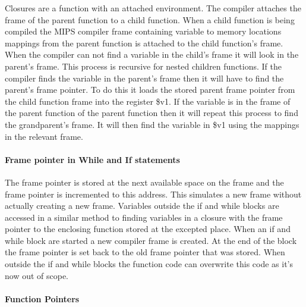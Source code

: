 \documentclass{article}
\begin{document}
	Closures are a function with an attached environment. The compiler attaches the frame of the parent function to a child function. When a child function is being compiled the MIPS compiler frame containing variable to memory locations mappings from the parent function is attached to the child function's frame. When the compiler can not find a variable in the child's frame it will look in the parent's frame. This process is recursive for nested children functions. If the compiler finds the variable in the parent's frame then  it will have to find the parent's frame pointer. To do this it loads the stored parent frame pointer from the child function frame into the register \$v1. If the variable is in the frame of the parent function of the parent function then it will repeat this process to find the grandparent's frame. It will then find the variable in \$v1 using the mappings in the relevant frame.
	
	\paragraph{Frame pointer in While and If statements}
	
	The frame pointer is stored at the next available space on the frame and the frame pointer is incremented to this address. This simulates a new frame without actually creating a new frame. Variables outside the if and while blocks are accessed in a similar method to finding variables in a closure with the frame pointer to the enclosing function stored at the excepted place. When an if and while block are started a new compiler frame is created. At the end of the block the frame pointer is set back to the old frame pointer that was stored. When outside the if and while blocks the function code can overwrite this code as it's now out of scope. 
	
	\paragraph{Function Pointers}
	
\end{document}
